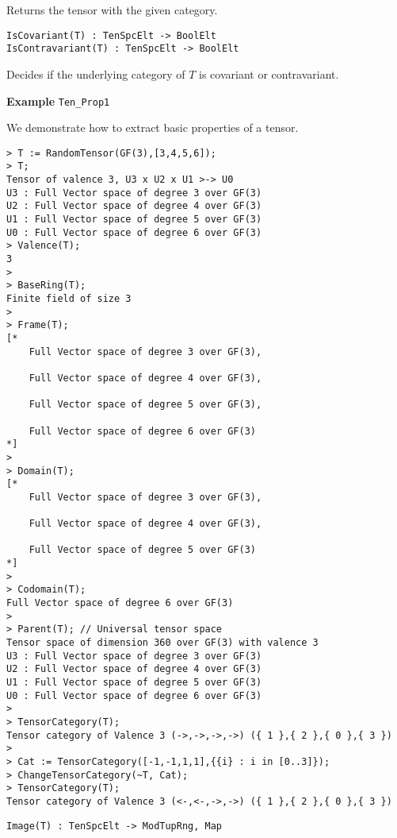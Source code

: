 Returns the tensor with the given category.

\color{blue}
{\small \begin{verbatim}
IsCovariant(T) : TenSpcElt -> BoolElt
IsContravariant(T) : TenSpcElt -> BoolElt
\end{verbatim} }
\color{black}

Decides if the underlying category of $T$ is covariant or contravariant.

\begin{framed} {\bf Example} {\tt Ten\_Prop1}\\
{\small We demonstrate how to extract basic properties of a tensor.
\begin{lstlisting}[frame=single,basicstyle=\ttfamily\color{black!30!
teal},backgroundcolor=\color{white!70!gray}]
> T := RandomTensor(GF(3),[3,4,5,6]);
> T;
Tensor of valence 3, U3 x U2 x U1 >-> U0
U3 : Full Vector space of degree 3 over GF(3)
U2 : Full Vector space of degree 4 over GF(3)
U1 : Full Vector space of degree 5 over GF(3)
U0 : Full Vector space of degree 6 over GF(3)
> Valence(T);
3
> 
> BaseRing(T);
Finite field of size 3
> 
> Frame(T);
[*
    Full Vector space of degree 3 over GF(3),

    Full Vector space of degree 4 over GF(3),

    Full Vector space of degree 5 over GF(3),

    Full Vector space of degree 6 over GF(3)
*]
> 
> Domain(T);
[*
    Full Vector space of degree 3 over GF(3),

    Full Vector space of degree 4 over GF(3),

    Full Vector space of degree 5 over GF(3)
*]
> 
> Codomain(T);
Full Vector space of degree 6 over GF(3)
> 
> Parent(T); // Universal tensor space
Tensor space of dimension 360 over GF(3) with valence 3
U3 : Full Vector space of degree 3 over GF(3)
U2 : Full Vector space of degree 4 over GF(3)
U1 : Full Vector space of degree 5 over GF(3)
U0 : Full Vector space of degree 6 over GF(3)
> 
> TensorCategory(T);
Tensor category of Valence 3 (->,->,->,->) ({ 1 },{ 2 },{ 0 },{ 3 })
> 
> Cat := TensorCategory([-1,-1,1,1],{{i} : i in [0..3]});
> ChangeTensorCategory(~T, Cat);
> TensorCategory(T);
Tensor category of Valence 3 (<-,<-,->,->) ({ 1 },{ 2 },{ 0 },{ 3 })
\end{lstlisting} }
\end{framed}

\color{blue}
{\small \begin{verbatim}
Image(T) : TenSpcElt -> ModTupRng, Map
\end{verbatim} }
\color{black}

